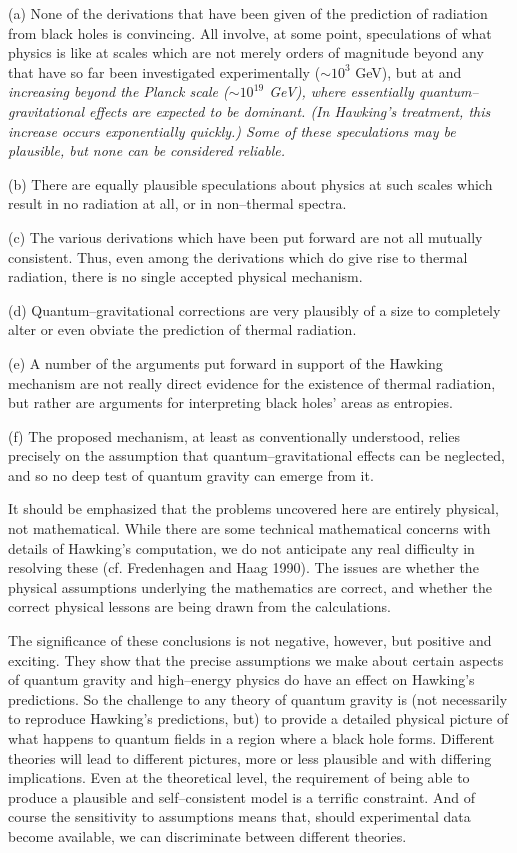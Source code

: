 (a) None of the derivations that have been given of the prediction of radiation
from black holes is convincing.  All involve, at some point, 
speculations of what physics is like at scales which are not merely orders of
magnitude  beyond any that have so far been investigated experimentally ($\sim
10^3$ GeV), but at and \it increasing beyond \rm the Planck
scale ($\sim 10^{19}$ GeV), where essentially quantum--gravitational effects
are expected to be dominant.  (In Hawking's treatment, this increase occurs \it
exponentially quickly.\rm ) Some of these speculations    may be plausible, but
none can be considered reliable.

(b) There are equally plausible speculations about physics at such scales which
result in no radiation at all, or in non--thermal spectra.

(c) The various derivations which have been put forward are not all mutually
consistent.  Thus, even among the derivations
which do give rise to thermal radiation, there is no single accepted
physical mechanism.

(d) Quantum--gravitational corrections are very plausibly of a size
to completely alter or even obviate the prediction of thermal radiation.

(e) A number of the arguments put forward in support of the Hawking
mechanism are not really direct evidence for the existence of thermal 
radiation,
but rather are arguments for interpreting black holes' areas as entropies.

(f) The proposed mechanism, at least as conventionally understood,
relies precisely on the assumption that quantum--gravitational effects can be
neglected, and so no deep test of quantum gravity can emerge from it.

\smallskip\noindent
It should be emphasized that the problems uncovered here are entirely
physical, not mathematical.  While there are some technical mathematical
concerns with details of Hawking's computation, we do not anticipate any real
difficulty in resolving these (cf. Fredenhagen and Haag 1990).  The
issues are whether the physical assumptions underlying the mathematics
are correct, and whether the correct physical lessons are being
drawn from the calculations.

The significance of these conclusions is not negative, however, but
positive and exciting.  They show that the precise assumptions we make about
certain aspects of quantum gravity and high--energy physics do have an effect
on Hawking's predictions.  So the challenge to any theory of quantum gravity is
(not necessarily to reproduce Hawking's predictions, but) to provide a detailed
physical picture of what happens to quantum fields in a region where a black
hole forms.  Different theories will lead to different pictures, more or less
plausible and with differing implications.  Even at the theoretical level, the
requirement of being able to produce a plausible and self--consistent model is
a terrific constraint.  And of course the sensitivity to assumptions means
that, should experimental data become available, we can discriminate between
different theories.  

